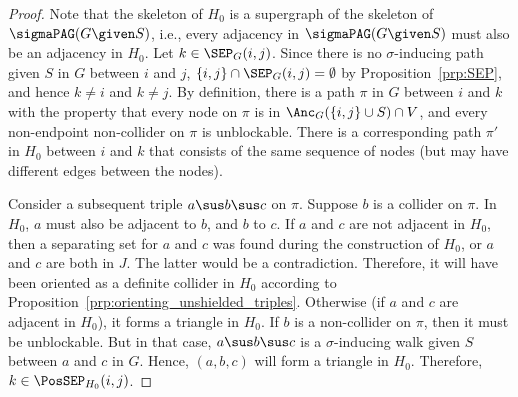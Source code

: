 \begin{proof}
  Note that the skeleton of $H_0$ is a supergraph of the skeleton of $\sigmaPAG(G \given S)$, i.e., every adjacency in $\sigmaPAG(G \given S)$ must also be an adjacency in $H_0$.
  Let $k \in \SEP_G(i,j)$.
  Since there is no $\sigma$-inducing path given $S$ in $G$ between $i$ and $j$, $\{i,j\} \cap \SEP_G(i,j) = \emptyset$ by Proposition~\ref{prp:SEP}, and hence $k \ne i$ and $k \ne j$.
  By definition, there is a path $\pi$ in $G$ between $i$ and $k$ with the property that every node on $\pi$ is in $\Anc_G(\{i,j\}\cup S) \cap V$, and every non-endpoint non-collider on $\pi$ is unblockable.
  There is a corresponding path $\pi'$ in $H_0$ between $i$ and $k$ that consists of the same sequence of nodes (but may have different edges between the nodes).

  Consider a subsequent triple $a \sus b \sus c$ on $\pi$.
  Suppose $b$ is a collider on $\pi$.
  In $H_0$, $a$ must also be adjacent to $b$, and $b$ to $c$.
  If $a$ and $c$ are not adjacent in $H_0$, then a separating set for $a$ and $c$ was found during the construction of $H_0$, or $a$ and $c$ are both in $J$.
  The latter would be a contradiction. 
  Therefore, it will have been oriented as a definite collider in $H_0$ according to Proposition~\ref{prp:orienting_unshielded_triples}.
  Otherwise (if $a$ and $c$ are adjacent in $H_0$), it forms a triangle in $H_0$.
  If $b$ is a non-collider on $\pi$, then it must be unblockable.
  But in that case, $a \sus b \sus c$ is a $\sigma$-inducing walk given $S$ between $a$ and $c$ in $G$.
  Hence, $(a,b,c)$ will form a triangle in $H_0$.
  Therefore, $k \in \PosSEP_{H_0}(i,j)$.
\end{proof}

